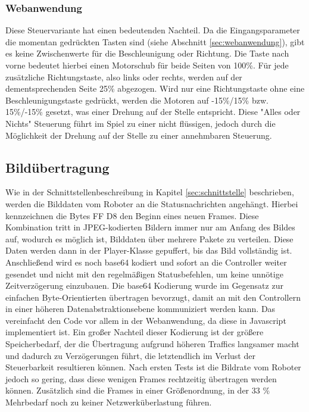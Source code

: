 \subsubsection{Webanwendung}
Diese Steuervariante hat einen bedeutenden Nachteil. Da die Eingangsparameter die momentan gedrückten Tasten sind (siehe Abschnitt \ref{sec:webanwendung}), gibt es keine Zwischenwerte für die Beschleunigung oder Richtung. Die Taste nach vorne bedeutet hierbei einen Motorschub für beide Seiten von 100\%. Für jede zusätzliche Richtungstaste, also links oder rechts, werden auf der dementsprechenden Seite 25\% abgezogen. Wird nur eine Richtungstaste ohne eine Beschleunigungstaste gedrückt, werden die Motoren auf -15\%/15\% bzw. 15\%/-15\% gesetzt, was einer Drehung auf der Stelle entspricht. Diese "Alles oder Nichts" Steuerung führt im Spiel zu einer nicht flüssigen, jedoch durch die Möglichkeit der Drehung auf der Stelle zu einer annehmbaren Steuerung.

\subsection{Bildübertragung}
Wie in der Schnittstellenbeschreibung in Kapitel \ref{sec:schnittstelle} beschrieben, werden die Bilddaten vom Roboter an die Statusnachrichten angehängt. Hierbei kennzeichnen die Bytes FF D8 den Beginn eines neuen Frames. Diese Kombination tritt in JPEG-kodierten Bildern immer nur am Anfang des Bildes auf, wodurch es möglich ist, Bilddaten über mehrere Pakete zu verteilen. Diese Daten werden dann in der Player-Klasse gepuffert, bis das Bild vollständig ist. Anschließend wird es noch base64 kodiert und sofort an die Controller weiter gesendet und nicht mit den regelmäßigen Statusbefehlen, um keine unnötige Zeitverzögerung einzubauen. Die base64 Kodierung wurde im Gegensatz zur einfachen Byte-Orientierten übertragen bevorzugt, damit an mit den Controllern in einer höheren Datenabstraktionsebene kommuniziert werden kann. Das vereinfacht den Code vor allem in der Webanwendung, da diese in Javascript implementiert ist. Ein großer Nachteil dieser Kodierung ist der größere Speicherbedarf, der die Übertragung aufgrund höheren Traffics langsamer macht und dadurch zu Verzögerungen führt, die letztendlich im Verlust der Steuerbarkeit resultieren können. Nach ersten Tests ist die Bildrate vom Roboter jedoch so gering, dass diese wenigen Frames rechtzeitig übertragen werden können. Zusätzlich sind die Frames in einer Größenordnung, in der 33 \% Mehrbedarf noch zu keiner Netzwerküberlastung führen.



